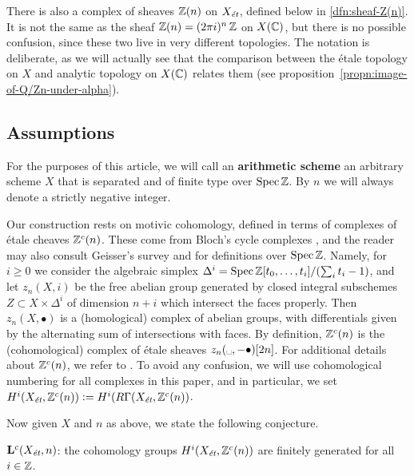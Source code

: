 \documentclass{article}
\numberwithin{equation}{section}
\begin{document}
There is also a complex of sheaves $\ZZ (n)$ on $X_\et$, defined below in
\ref{dfn:sheaf-Z(n)}. It is not the same as the sheaf
$\ZZ (n) = (2\pi i)^n\,\ZZ$ on $X (\CC)$, but there is no possible confusion,
since these two live in very different topologies. The notation is deliberate,
as we will actually see that the comparison between the étale topology on $X$
and analytic topology on $X (\CC)$ relates them
(see proposition~\ref{propn:image-of-Q/Zn-under-alpha}).

\subsection*{Assumptions}

For the purposes of this article, we will call an \textbf{arithmetic scheme} an
arbitrary scheme $X$ that is separated and of finite type over $\Spec \ZZ$.
By $n$ we will always denote a strictly negative integer.

Our construction rests on motivic cohomology, defined in terms of complexes
of étale cheaves $\ZZ^c (n)$. These come from Bloch's cycle complexes
\cite{Bloch-1986}, and the reader may also consult Geisser's survey
\cite{Geisser-2005} and \cite{Geisser-2004-Dedekind} for definitions over
$\Spec \ZZ$. Namely, for $i \ge 0$ we consider the algebraic simplex
$\Delta^i = \Spec \ZZ[t_0,\ldots,t_i]/(\sum_i t_i - 1)$, and let $z_n (X,i)$ be
the free abelian group generated by closed integral subschemes
$Z \subset X \times \Delta^i$ of dimension $n + i$ which intersect the faces
properly. Then $z_n (X, \bullet)$ is a (homological) complex of abelian groups,
with differentials given by the alternating sum of intersections with faces.
By definition, $\ZZ^c (n)$ is the (cohomological) complex of étale sheaves
$z_n (\text{\textvisiblespace}, -\bullet) [2n]$. For additional details about
$\ZZ^c (n)$, we refer to \cite[\S 2]{Geisser-2010}. To avoid any confusion,
we will use cohomological numbering for all complexes in this paper, and in
particular, we set $H^i (X_\et, \ZZ^c(n)) \dfn H^i (R\Gamma (X_\et, \ZZ^c(n))$.

\vspace{1em}

Now given $X$ and $n$ as above, we state the following conjecture.

\begin{conjecture}
  $\mathbf{L}^c (X_\et,n)$: the cohomology groups $H^i (X_\et, \ZZ^c (n))$ are
  finitely generated for all $i \in \ZZ$.
\end{conjecture}
\end{document}
